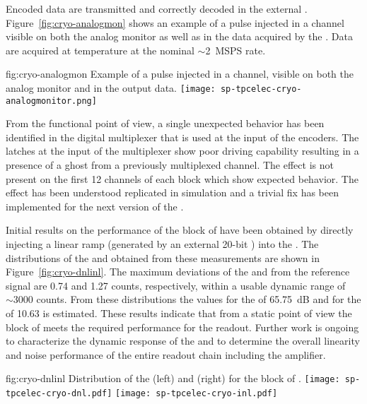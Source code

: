 Encoded data are transmitted and correctly decoded in the external . 
Figure~\ref{fig:cryo-analogmon} shows an example of a pulse injected in a channel 
visible on both the analog monitor as well as in the data acquired by the . 
Data are acquired at \lntwo temperature at the nominal $\sim$\SI{2}{MSPS} rate.

\begin{dunefigure}
{fig:cryo-analogmon}
{Example of a pulse injected in a   channel, visible on both the analog monitor and in the output data.}
\texttt{[image: sp-tpcelec-cryo-analogmonitor.png]}
\end{dunefigure}

From the functional point of view, a single unexpected behavior has been identified 
in the digital multiplexer that is used at the input of the encoders. The latches
at the input of the multiplexer show poor driving capability resulting in a presence
of a ghost from a previously multiplexed channel. The effect is not present on the 
first 12 channels of each block which show expected behavior. The effect has been
understood replicated in simulation and a trivial fix has been implemented for 
the next version of the .

Initial results on the performance of the  block of  have
been obtained by directly injecting a linear ramp (generated by an external
\num{20}-bit ) into the . The distributions of the 
and  obtained from these measurements are shown in Figure~\ref{fig:cryo-dnlinl}.
The maximum deviations of the  and  from the reference
signal are \num{0.74} and \num{1.27}  counts, respectively, within
a usable dynamic range of $\sim\num{3000}$  counts. From these
distributions the values for the  of \SI{65.75}{dB} and for
the  of \num{10.63} is estimated. These results indicate
that from a static point of view the  block of 
meets the required performance for the   readout.
Further work is ongoing to characterize the dynamic response of the
 and to determine the overall linearity and noise performance
of the entire readout chain including the  amplifier.

\begin{dunefigure}
{fig:cryo-dnlinl}
{Distribution of the  (left) and  (right) for the
 block of .}
\texttt{[image: sp-tpcelec-cryo-dnl.pdf]}
\texttt{[image: sp-tpcelec-cryo-inl.pdf]}
\end{dunefigure}

